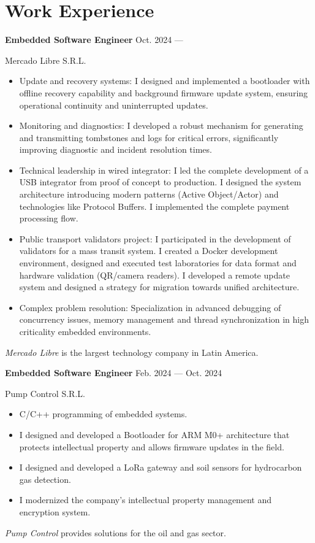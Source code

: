 \section{Work Experience}

\parbox[t][][t]{\linewidth}{
	\parbox{\linewidth}{
		\textbf{Embedded Software Engineer}
			\hfill
			{Oct. 2024 --- \phantom{Dec. 2099}}
		}
	\smallbreak
	\parbox{\linewidth}{Mercado Libre S.R.L.}
	\smallbreak
		\begin{itemize}
			\item{Update and recovery systems: I designed and implemented a bootloader with offline recovery capability and background firmware update system, ensuring operational continuity and uninterrupted updates.}
			\item{Monitoring and diagnostics: I developed a robust mechanism for generating and transmitting tombstones and logs for critical errors, significantly improving diagnostic and incident resolution times.}
			\item{Technical leadership in wired integrator: I led the complete development of a USB integrator from proof of concept to production. I designed the system architecture introducing modern patterns (Active Object/Actor) and technologies like Protocol Buffers. I implemented the complete payment processing flow.}
			\item{Public transport validators project: I participated in the development of validators for a mass transit system. I created a Docker development environment, designed and executed test laboratories for data format and hardware validation (QR/camera readers). I developed a remote update system and designed a strategy for migration towards unified architecture.}
			\item{Complex problem resolution: Specialization in advanced debugging of concurrency issues, memory management and thread synchronization in high criticality embedded environments.}
		\end{itemize}
	\smallbreak
    \emph{Mercado Libre} is the largest technology company in Latin America.
}

\parbox[t][][t]{\linewidth}{
	\parbox{\linewidth}{
		\textbf{Embedded Software Engineer}
			\hfill
			{Feb. 2024 --- Oct. 2024}
		}
	\smallbreak
	\parbox{\linewidth}{Pump Control S.R.L.}
	\smallbreak
		\begin{itemize}
			\item{C/C++ programming of embedded systems.}
			\item{I designed and developed a Bootloader for ARM M0+ architecture that protects intellectual property and allows firmware updates in the field.}
			\item{I designed and developed a LoRa gateway and soil sensors for hydrocarbon gas detection.}
			\item{I modernized the company's intellectual property management and encryption system.}
		\end{itemize}
	\smallbreak
    \emph{Pump Control} provides solutions for the oil and gas sector.
}

